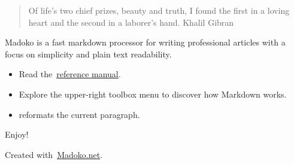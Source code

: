 \documentclass{article}
\begin{document}
\mdxtitleblockstart{}

\mdxauthorstart{}
\mdxauthorend\mdxtitleblockend%

\begin{quote}%

\noindent{}Of life's two chief prizes, beauty and truth,
I found the first in a loving heart and the
second in a laborer's hand.\mdbr
{}\hspace*{1em}\hspace*{1em} \textemdash{} Khalil Gibran%
\end{quote}%

\mdhr{}%

\mdxtitleblockstart{}

\mdxauthorstart{}
\mdxauthorend\mdxtitleblockend%

\noindent{}%

Madoko is a fast markdown processor for writing professional articles
with a focus on simplicity and plain text readability.%

\begin{itemize}[noitemsep,topsep=\mdcompacttopsep]%

\item{}Read the~\href{http://research.microsoft.com/en-us/um/people/daan/madoko/doc/reference.html}{reference manual}.%

\item{}Explore the upper-right toolbox menu to discover how Markdown works.%

\item{} reformats the current paragraph.%
\end{itemize}%

\noindent{}Enjoy!%

\begin{mdbmargintb}{4em}{}%
\begin{mdflushright}%
{\tiny{}Created with~\href{https://www.madoko.net}{Madoko.net}.}%
\end{mdflushright}%
\end{mdbmargintb}%
\end{document}
